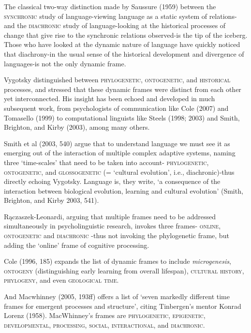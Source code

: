 The classical two-way distinction made by Saussure (1959) between the 
\textsc{synchronic} study of language-viewing language as a static 
system of relations-and the \textsc{diachronic} study of 
language-looking at the historical processes of change that give rise to 
the synchronic relations observed-is the tip of the iceberg. Those who 
have looked at the dynamic nature of language have quickly noticed that 
diachrony-in the usual sense of the historical development and 
divergence of languages-is not the only dynamic frame. 



Vygotsky distinguished between \textsc{phylogenetic}, \textsc{
ontogenetic}, and \textsc{historical} processes, and stressed that 
these dynamic frames were distinct from each other yet interconnected. 
His insight has been echoed and developed in much subsequent work, from 
psychologists of communication like Cole (2007) and Tomasello (1999) to 
computational linguists like Steels (1998; 2003) and Smith, Brighton, 
and Kirby (2003), among many others. 



Smith et al (2003, 540) argue that to understand language we must see it 
as emerging out of the interaction of multiple complex adaptive systems, 
naming three \textquoteleft time-scales' that need to be taken into account-\textsc{
phylogenetic}, \textsc{ontogenetic}, and \textsc{glossogenetic} 
(= \textquoteleft cultural evolution', i.e., diachronic)-thus directly echoing 
Vygotsky. Language is, they write, \textquoteleft a consequence of the interaction 
between biological evolution, learning and cultural evolution' (Smith, 
Brighton, and Kirby 2003, 541). 



R\k{a}czaszek-Leonardi, arguing that multiple frames need to be addressed 
simultaneously in psycholinguistic research, invokes three frames-
\textsc{online}, \textsc{ontogenetic }and \textsc{diachronic}
-thus not invoking the phylogenetic frame, but adding the \textquoteleft online' frame 
of cognitive processing. 



Cole (1996, 185) expands the list of dynamic frames to include \textit{
microgenesis}, \textsc{ontogeny} (distinguishing early learning from 
overall lifespan), \textsc{cultural history}, \textsc{phylogeny}, 
and even \textsc{geological time}. 



And Macwhinney (2005, 193ff) offers a list of \textquoteleft seven markedly different 
time frames for emergent processes and structure', citing Tinbergen's 
mentor Konrad Lorenz (1958). MacWhinney's frames are \textsc{
phylogenetic}, \textsc{epigenetic}, \textsc{developmental}, 
\textsc{processing}, \textsc{social}, \textsc{interactional}, 
and \textsc{diachronic}. 



